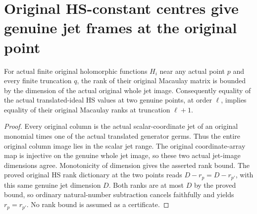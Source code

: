 \section{Original HS-constant centres give genuine jet frames at the original point}

\begin{theorem}
\label{hir:actual-centre-jet-rank-bound-and-hs-inversion}
For actual finite original holomorphic functions $H_i$ near any actual
point $p$ and every finite truncation $q$, the rank of their original
Macaulay matrix is bounded by the dimension of the actual original
whole jet image. Consequently equality of the actual translated-ideal
HS values at two genuine points, at order $\ell$, implies equality
of their original Macaulay ranks at truncation $\ell+1$.
\leanok
\end{theorem}
\begin{proof}
Every original column is the actual scalar-coordinate jet of an
original monomial times one of the actual translated generator germs.
Thus the entire original column image lies in the scalar jet range.
The original coordinate-array map is injective on the genuine whole
jet image, so these two actual jet-image dimensions agree. Monotonicity
of dimension gives the asserted rank bound. The proved original HS
rank dictionary at the two points reads $D-r_p=D-r_{p'}$, with this
same genuine jet dimension $D$. Both ranks are at most $D$ by the
proved bound, so ordinary natural-number subtraction cancels faithfully
and yields $r_p=r_{p'}$. No rank bound is assumed as a certificate.
\end{proof}

